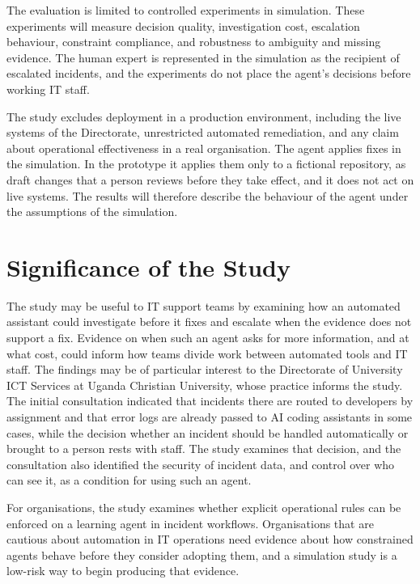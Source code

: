 The evaluation is limited to controlled experiments in simulation. These experiments will measure decision quality, investigation cost, escalation behaviour, constraint compliance, and robustness to ambiguity and missing evidence. The human expert is represented in the simulation as the recipient of escalated incidents, and the experiments do not place the agent's decisions before working IT staff.

The study excludes deployment in a production environment, including the live systems of the Directorate, unrestricted automated remediation, and any claim about operational effectiveness in a real organisation. The agent applies fixes in the simulation. In the prototype it applies them only to a fictional repository, as draft changes that a person reviews before they take effect, and it does not act on live systems. The results will therefore describe the behaviour of the agent under the assumptions of the simulation.

\section{Significance of the Study}

The study may be useful to IT support teams by examining how an automated assistant could investigate before it fixes and escalate when the evidence does not support a fix. Evidence on when such an agent asks for more information, and at what cost, could inform how teams divide work between automated tools and IT staff. The findings may be of particular interest to the Directorate of University ICT Services at Uganda Christian University, whose practice informs the study. The initial consultation indicated that incidents there are routed to developers by assignment and that error logs are already passed to AI coding assistants in some cases, while the decision whether an incident should be handled automatically or brought to a person rests with staff. The study examines that decision, and the consultation also identified the security of incident data, and control over who can see it, as a condition for using such an agent.

For organisations, the study examines whether explicit operational rules can be enforced on a learning agent in incident workflows. Organisations that are cautious about automation in IT operations need evidence about how constrained agents behave before they consider adopting them, and a simulation study is a low-risk way to begin producing that evidence.

